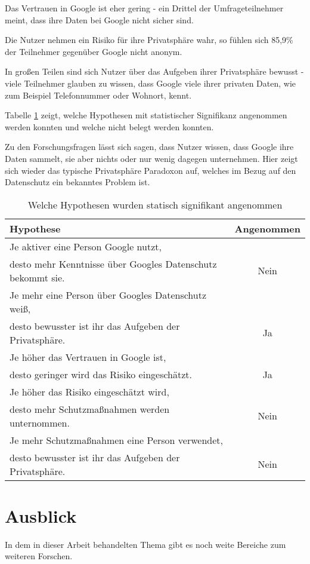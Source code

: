 Das Vertrauen in Google ist eher gering - ein Drittel der Umfrageteilnehmer meint, dass ihre Daten bei Google nicht sicher sind.

Die Nutzer nehmen ein Risiko für ihre Privatsphäre wahr, so fühlen sich 85,9\% der Teilnehmer gegenüber Google nicht anonym.

In großen Teilen sind sich Nutzer über das Aufgeben ihrer Privatsphäre bewusst - viele Teilnehmer glauben zu wissen, dass Google viele ihrer privaten Daten, wie zum Beispiel Telefonnummer oder Wohnort, kennt.

Tabelle \ref{hypothesenangenommen} zeigt, welche Hypothesen mit statistischer Signifikanz angenommen werden konnten und welche nicht belegt werden konnten.

Zu den Forschungsfragen lässt sich sagen, dass Nutzer wissen, dass Google ihre Daten sammelt, sie aber nichts oder nur wenig dagegen unternehmen. Hier zeigt sich wieder das typische Privatsphäre Paradoxon auf, welches im Bezug auf den Datenschutz ein bekanntes Problem ist.

\begin{table}
	\begin{tabular}[]{l | c }
	Hypothese & Angenommen\\\hline\hline
	Je aktiver eine Person Google nutzt,\\ desto mehr Kenntnisse über Googles Datenschutz bekommt sie. & Nein\\ \hline
	Je mehr eine Person über Googles Datenschutz weiß,\\ desto bewusster ist ihr das Aufgeben der Privatsphäre. & Ja\\ \hline
	Je höher das Vertrauen in Google ist,\\ desto geringer wird das Risiko eingeschätzt.&Ja\\\hline
	Je höher das Risiko eingeschätzt wird,\\ desto mehr Schutzmaßnahmen werden unternommen.&Nein\\\hline
	Je mehr Schutzmaßnahmen eine Person verwendet,\\ desto bewusster ist ihr das Aufgeben der Privatsphäre.&Nein\\\hline
	\end{tabular}
	\caption{Welche Hypothesen wurden statisch signifikant angenommen}\label{hypothesenangenommen}
\end{table}

\section{Ausblick}
In dem in dieser Arbeit behandelten Thema gibt es noch weite Bereiche zum weiteren Forschen.

